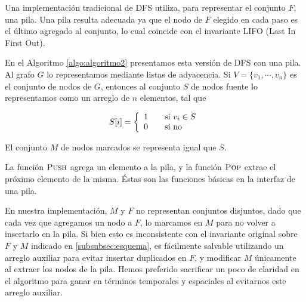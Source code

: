 Una implementación tradicional de DFS utiliza, para representar el conjunto $F$, una pila. Una pila resulta adecuada ya que el nodo de $F$ elegido en cada paso es el último agregado al conjunto, lo cual coincide con el invariante LIFO (Last In First Out).

En el Algoritmo \ref{algo:algoritmo2} presentamos esta versión de DFS con una pila. Al grafo $G$ lo representamos mediante listas de adyacencia. Si $V = \{v_1, \cdots, v_n\}$ es el conjunto de nodos de $G$, entonces al conjunto $S$ de nodos fuente lo representamos como un arreglo de $n$ elementos, tal que 

\[S[i] = \left\{ 
  \begin{array}{l l}
    1 & \quad \text{si } v_i \in S\\
    0 & \quad \text{si no}
  \end{array} \right.
\]

El conjunto $M$ de nodos marcados se representa igual que $S$.

\begin{algorithm}
	\DontPrintSemicolon
 	\BlankLine
\caption{$\textsc{Iterative-DFS}$}
\label{algo:algoritmo2}
\end{algorithm}

La función $\textsc{Push}$ agrega un elemento a la pila, y la función $\textsc{Pop}$ extrae el próximo elemento de la misma. Éstas son las funciones básicas en la interfaz de una pila.

En nuestra implementación, $M$ y $F$ no representan conjuntos disjuntos, dado que cada vez que agregamos un nodo a $F$, lo marcamos en $M$ para no volver a insertarlo en la pila. Si bien esto es inconsistente con el invariante original sobre $F$ y $M$ indicado en \ref{subsubsec:esquema}, es fácilmente salvable utilizando un arreglo auxiliar para evitar insertar duplicados en $F$, y modificar $M$ únicamente al extraer los nodos de la pila. Hemos preferido sacrificar un poco de claridad en el algoritmo para ganar en términos temporales y espaciales al evitarnos este arreglo auxiliar.

